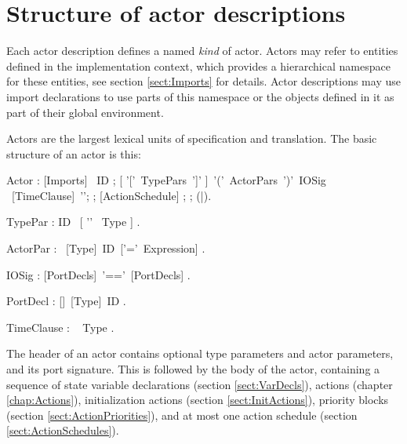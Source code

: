 


\chapter{Structure of actor descriptions}\label{chap:Actor}

Each actor description defines a named {\em kind} of actor. Actors may
refer to entities defined in the implementation context, which
provides a hierarchical namespace for these entities, see section
\ref{sect:Imports} for details. Actor descriptions may use import
declarations to use parts of this namespace or the objects defined in
it as part of their global environment.


Actors are the largest lexical units of specification and translation.
The basic structure of an actor is this:


\bgr
Actor : [Imports] \kwActor ~ID ;
    [ '['~TypePars~']' ]~'('~ActorPars~')'~IOSig ~[TimeClause]~'\charColon';
     ;
    [ActionSchedule] ;
     ;
    (\kwEnd|\kwEndActor).

TypePar : ID~ [ '\charLess'~ Type ] .

ActorPar : ~[Type]~ID~['='~Expression] .

IOSig : [PortDecls]~'==\charMore'~[PortDecls] .

PortDecl : [\kwMulti]~[Type]~ID .

TimeClause : \kwTime~ Type .
\egr

 
 
The header of an actor contains optional type parameters and actor
parameters, and its port signature. This is followed by the body of the
actor, containing a sequence of state variable declarations (section
\ref{sect:VarDecls}), actions (chapter \ref{chap:Actions}),
initialization actions (section \ref{sect:InitActions}), priority blocks
(section \ref{sect:ActionPriorities}), and at most one action schedule
(section \ref{sect:ActionSchedules}).

